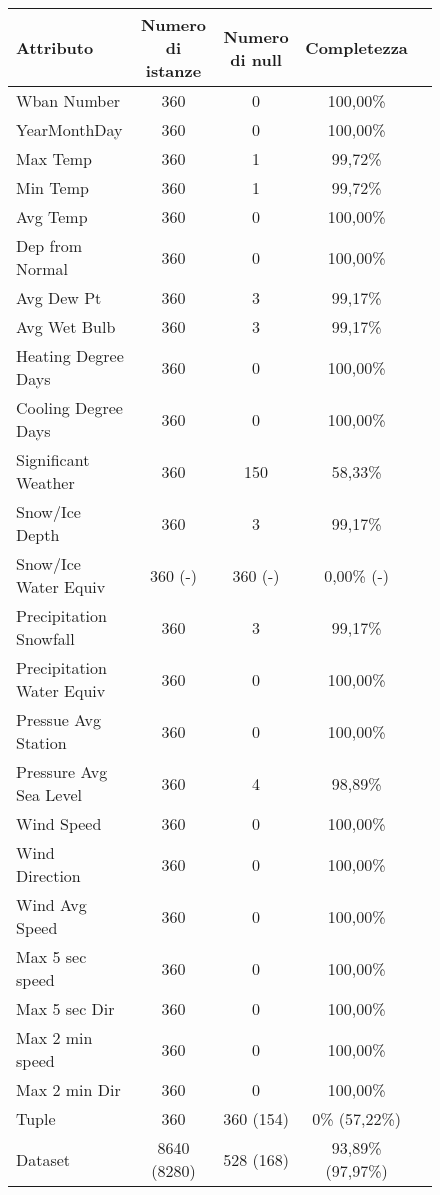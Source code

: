 \begin{figure}[H]
	\centering
	\begin{tabular}{lcccc}
		\toprule
		\textbf{Attributo} \quad & \textbf{Numero di istanze} & \textbf{Numero di null} & \textbf{Completezza} \\
			\midrule
		Wban Number					&  360  &  0  &    100,00\% \\    
		YearMonthDay				&  360  &  0  &    100,00\% \\  
		Max Temp					&  360  &  1  &    99,72\% \\    
		Min Temp					&  360  &  1  &    99,72\% \\    
		Avg Temp					&  360  &  0  &    100,00\% \\    
		Dep from Normal			&	360  &  0  &    100,00\% \\	
		Avg Dew Pt					&  360  &  3  &    99,17\% \\    
		Avg Wet Bulb				&	360  &  3  &    99,17\% \\   
		Heating Degree Days		&	360  &  0  &    100,00\% \\	
		Cooling Degree Days		&	360  &  0  &    100,00\% \\	
		Significant Weather		&	360  &  150  &    58,33\% \\	
		Snow/Ice Depth				&	360  &  3  &    99,17\% \\   
		Snow/Ice Water Equiv		&	360 (-)  &  360 (-) &    0,00\% (-) \\	
		Precipitation Snowfall		&	360  &  3  &    99,17\% \\	
		Precipitation Water Equiv	&	360  &  0  &    100,00\% \\	 
		Pressue Avg Station		&	360  &  0  &    100,00\% \\	
		Pressure Avg Sea Level		&	360  &  4  &    98,89\% \\	
		Wind Speed					&  360  &  0  &    100,00\% \\    
		Wind Direction				&	360  &  0  &    100,00\% \\   
		Wind Avg Speed				&	360  &  0  &    100,00\% \\   
		Max 5 sec speed				&	360  &  0  &    100,00\% \\   
		Max 5 sec Dir				&	360  &  0  &    100,00\% \\   
		Max 2 min speed				&	360  &  0  &    100,00\% \\   
		Max 2 min Dir				&	360  &  0  &    100,00\% \\   
		\midrule
		Tuple 		&				360  &	360 (154)			   & 0\% (57,22\%)\\
		Dataset  	&	   8640 (8280)  &	528 (168) 		   & 93,89\% (97,97\%)\\
		\bottomrule
	\end{tabular}
	\label{tab:completezza weather from Jen to Apr 2007}
\end{figure}

